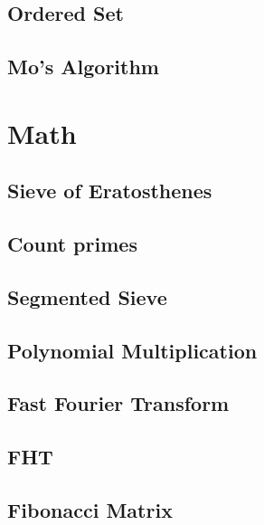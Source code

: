 \subsection{Ordered Set}
\raggedbottom
\hrulefill
\subsection{Mo's Algorithm}
\raggedbottom
\hrulefill

\section{Math}
\subsection{Sieve of Eratosthenes}
\raggedbottom
\hrulefill
\subsection{Count primes}
\raggedbottom
\hrulefill
\subsection{Segmented Sieve}
\raggedbottom
\hrulefill
\subsection{Polynomial Multiplication}
\raggedbottom
\hrulefill
\subsection{Fast Fourier Transform}
\raggedbottom
\hrulefill
\subsection{FHT}
\raggedbottom
\hrulefill
\subsection{Fibonacci Matrix}
\raggedbottom
\hrulefill
